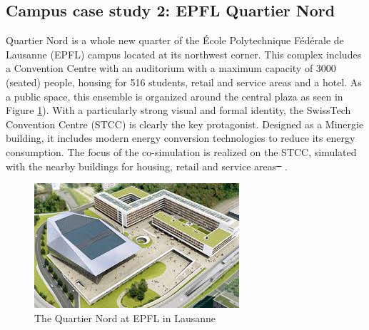 \documentclass{tBPS2e}
\theoremstyle{plain}
\theoremstyle{definition}
\theoremstyle{remark}
\providecommand{\DIFdel}[1]{{\protect\color{red}\sout{#1}}}                      %
\providecommand{\DIFaddend}{} %
\providecommand{\DIFdelbegin}{} %
\providecommand{\DIFdelend}{} %
\begin{document}



\DIFaddend \subsection{Campus case study 2: EPFL Quartier Nord} 
Quartier Nord is a whole new quarter of the École Polytechnique Fédérale de
Lausanne (EPFL) campus located at its northwest corner. This complex includes
a Convention Centre with an auditorium with a maximum capacity of 3000
(seated) people, housing for 516 students, retail and service areas and a
hotel. As a public space, this ensemble is organized around the central plaza as
seen in Figure \ref{fig:quartier_nord_1}). With a particularly strong visual and formal identity, the SwissTech
Convention Centre (STCC) is clearly the key protagonist.  Designed as a
Minergie building, it includes modern energy conversion
technologies to reduce its energy consumption. The focus of the co-simulation
is realized on the STCC, simulated with the nearby buildings for housing,
retail and service areas\DIFdelbegin \DIFdel{\mbox{%
\citep{beyeler_minergie:_2009}}%
}\DIFdelend .

\begin{figure}[H]
\centering
\includegraphics[]{figures/quartier_nord_1}
\caption{The Quartier Nord at EPFL in Lausanne}
\label{fig:quartier_nord_1}
\end{figure}

\end{document}
